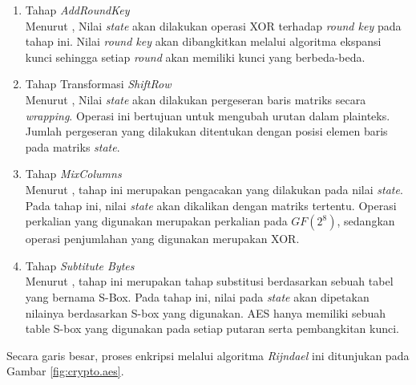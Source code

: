 \begin{enumerate}
  \item Tahap \emph{AddRoundKey}\\Menurut \textcite{munir2019}, Nilai \emph{state} akan dilakukan operasi XOR terhadap \emph{round key} pada tahap ini. Nilai \emph{round key} akan dibangkitkan melalui algoritma ekspansi kunci sehingga setiap \emph{round} akan memiliki kunci yang berbeda-beda.  
  \item Tahap Transformasi \emph{ShiftRow}\\Menurut \textcite{munir2019}, Nilai \emph{state} akan dilakukan pergeseran baris matriks secara \emph{wrapping}. Operasi ini bertujuan untuk mengubah urutan dalam plainteks. Jumlah pergeseran yang dilakukan ditentukan dengan posisi elemen baris pada matriks \emph{state}.
  \item Tahap \emph{MixColumns}\\Menurut \textcite{munir2019}, tahap ini merupakan pengacakan yang dilakukan pada nilai \emph{state}. Pada tahap ini, nilai \emph{state} akan dikalikan dengan matriks tertentu. Operasi perkalian yang digunakan merupakan perkalian pada $GF(2^8)$, sedangkan operasi penjumlahan yang digunakan merupakan XOR.
  \item Tahap \emph{Subtitute Bytes}\\Menurut \textcite{munir2019}, tahap ini merupakan tahap substitusi berdasarkan sebuah tabel yang bernama S-Box. Pada tahap ini, nilai pada \emph{state} akan dipetakan nilainya berdasarkan S-box yang digunakan. AES hanya memiliki sebuah table S-box yang digunakan pada setiap putaran serta pembangkitan kunci.
\end{enumerate}

Secara garis besar, proses enkripsi melalui algoritma \emph{Rijndael} ini ditunjukan pada Gambar \ref{fig:crypto.aes}.


